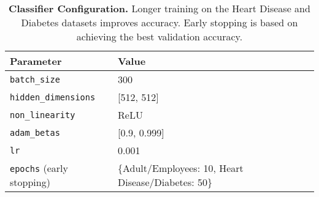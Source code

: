 \documentclass[runningheads]{llncs}
\begin{document}
\begin{table*}[h]
\centering
\renewcommand{\arraystretch}{1.3}
\setlength{\tabcolsep}{12pt}
\begin{tabular}{ll}
\hline
\textbf{Parameter}                      & \textbf{Value} \\ \hline
\texttt{batch\_size}                    & 300            \\
\texttt{hidden\_dimensions}             & [512, 512]     \\
\texttt{non\_linearity}                 & ReLU           \\
\texttt{adam\_betas}                    & [0.9, 0.999]   \\
\texttt{lr}                             & 0.001          \\
\texttt{epochs} (early stopping)                         & \{Adult/Employees: 10, Heart Disease/Diabetes: 50\}\\
\hline
\end{tabular}
\caption{\textbf{Classifier Configuration.} Longer training on the Heart Disease and Diabetes datasets improves accuracy. Early stopping is based on achieving the best validation accuracy.}
\label{tab:classifier}
\end{table*}
\end{document}
